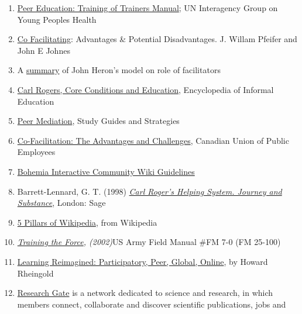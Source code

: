 \begin{enumerate}
\item
  \href{http://www.scribd.com/doc/54544925/51/TRAINING-TOPIC-Co-facilitation-skills}{Peer
  Education: Training of Trainers Manual}; UN Interagency Group on Young
  Peoples Health
\item
  \href{http://www.breakoutofthebox.com/Co-FacilitatingPfeifferJones.pdf}{Co
  Facilitating}: Advantages \& Potential Disadvantages. J. Willam
  Pfeifer and John E Johnes
\item
  A
  \href{http://reviewing.co.uk/archives/art/13\_1\_what\_do\_facilitators\_do.htm\#8\_WAYS\_OF\_FACILITATING\_ACTIVE\_LEARNING}{summary}
  of John Heron's model on role of facilitators
\item
  \href{http://www.infed.org/thinkers/et-rogers.htm}{C}\href{http://www.infed.org/thinkers/et-rogers.htm}{arl
  Rogers, Core Conditions and Education}, Encyclopedia of Informal
  Education
\item
  \href{http://www.studygs.net/peermed.htm}{Peer Mediation}, Study
  Guides and Strategies
\item
  \href{http://sk.cupe.ca/updir/cofacilitation-handouts.doc}{Co-Facilitation:
  The Advantages and Challenges}, Canadian Union of Public Employees
\item
  \href{http://community.bistudio.com/wiki/Bohemia\_Interactive\_Community:Guidelines}{Bohemia
  Interactive Community Wiki Guidelines}
\item
  Barrett-Lennard, G. T. (1998)
  \href{http://openlibrary.org/works/OL2014352W/Carl\_Rogers'\_Helping\_System}{\emph{Carl
  Roger's Helping System. Journey and Substance}}, London: Sage
\item
  \href{http://en.wikipedia.org/w/index.php?title=Wikipedia:Five\_pillars\&oldid=501472166}{5
  Pillars of Wikipedia}, from Wikipedia
\item
  \emph{\href{http://www.africom.mil/WO-NCO/DownloadCenter/\%5C40Publications/Training\%20the\%20Force\%20Manual.pdf}{Training
  the Force}, (2002)}US Army Field Manual \#FM 7-0 (FM 25-100)
\item
  \href{http://dmlcentral.net/blog/howard-rheingold/learning-reimagined-participatory-peer-global-online}{Learning
  Reimagined: Participatory, Peer, Global, Online}, by Howard Rheingold
\item
  \href{http://www.researchgate.net/}{Research Gate} is a network
  dedicated to science and research, in which members connect,
  collaborate and discover scientific publications, jobs and

\end{enumerate}
